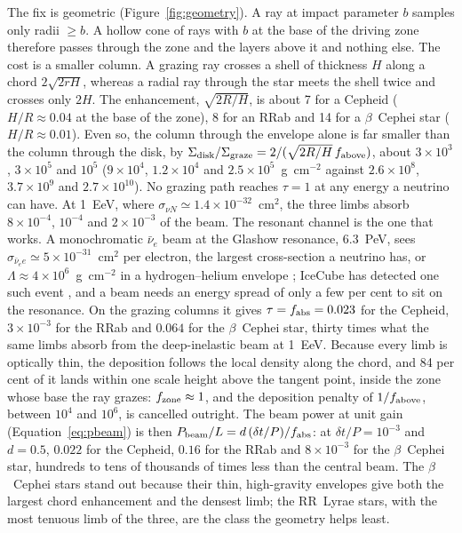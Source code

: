\documentclass[final,5p]{elsarticle}
\newcommand{\dtp}{\ensuremath{\delta t/P}}
\newcommand{\bcep}{\ensuremath{\beta}~Cephei}
\newcommand{\pbeam}{\ensuremath{P_{\rm beam}}}
\begin{document}
The fix is geometric (Figure~\ref{fig:geometry}). A ray at impact parameter $b$ samples only radii $\ge b$. A hollow cone of rays with $b$ at the base of the driving zone therefore passes through the zone and the layers above it and nothing else. The cost is a smaller column. A grazing ray crosses a shell of thickness $H$ along a chord $2\sqrt{2rH}$, whereas a radial ray through the star meets the shell twice and crosses only $2H$. The enhancement, $\sqrt{2R/H}$, is about 7 for a Cepheid ($H/R\approx0.04$ at the base of the zone), 8 for an RRab and 14 for a \bcep{} star ($H/R\approx0.01$). Even so, the column through the envelope alone is far smaller than the column through the disk, by { $\Sigma_{\rm disk}/\Sigma_{\rm graze}=2/(\sqrt{2R/H}\,f_{\rm above})$}, about $3\times10^{3}$, $3\times10^{5}$ and $10^{5}$ ($9\times10^{4}$, $1.2\times10^{4}$ and $2.5\times10^{5}$~g~cm$^{-2}$ against $2.6\times10^{8}$, $3.7\times10^{9}$ and $2.7\times10^{10}$). No grazing path reaches $\tau=1$ at any energy a neutrino can have. At 1~EeV, where $\sigma_{\nu N}\simeq1.4\times10^{-32}$~cm$^2$, the three limbs absorb $8\times10^{-4}$, $10^{-4}$ and $2\times10^{-3}$ of the beam. The resonant channel is the one that works. A monochromatic $\bar\nu_e$ beam at the Glashow resonance, 6.3~PeV, sees $\sigma_{\bar\nu_e e}\simeq5\times10^{-31}$~cm$^2$ per electron, the largest cross-section a neutrino has, or $\Lambda\approx4\times10^{6}$~g~cm$^{-2}$ in a hydrogen--helium envelope \citep{Gandhi1998}; IceCube has detected one such event \citep{IceCube2021glashow}, and a beam needs an energy spread of only a few per cent to sit on the resonance. On the grazing columns it gives $\tau=f_{\rm abs}=0.023$ for the Cepheid, $3\times10^{-3}$ for the RRab and $0.064$ for the \bcep{} star, thirty times what the same limbs absorb from the deep-inelastic beam at 1~EeV. Because every limb is optically thin, the deposition follows the local density along the chord, and 84 per cent of it lands within one scale height above the tangent point, inside the zone whose base the ray grazes: $f_{\rm zone}\approx1$, and the deposition penalty of $1/f_{\rm above}$, between $10^{4}$ and $10^{6}$, is cancelled outright. The beam power at unit gain (Equation~\ref{eq:pbeam}) is then $\pbeam/L=d\,(\dtp)/f_{\rm abs}$: at $\dtp=10^{-3}$ and $d=0.5$, $0.022$ for the Cepheid, $0.16$ for the RRab and $8\times10^{-3}$ for the \bcep{} star, hundreds to tens of thousands of times less than the central beam. The \bcep{} stars stand out because their thin, high-gravity envelopes give both the largest chord enhancement and the densest limb; the RR~Lyrae stars, with the most tenuous limb of the three, are the class the geometry helps least.
\end{document}
